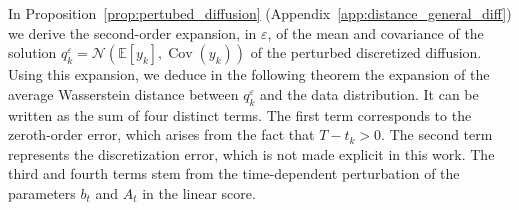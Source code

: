\documentclass[11pt]{article}
\newcommand{\EE}{\mathbb{E}}
\newcommand{\cov}{\operatorname{Cov}}
\begin{document}
In Proposition~\ref{prop:pertubed_diffusion} (Appendix~\ref{app:distance_general_diff}) we derive the second-order expansion, in $\varepsilon$, of the mean and covariance of the solution $q^\varepsilon_k = \mathcal{N}(\EE[y_{k}], \cov(y_k))$ of the perturbed discretized diffusion.
Using this expansion, we deduce in the following theorem the expansion of the average Wasserstein distance between $q_k^\varepsilon$ and the data distribution. It can be written as the sum of four distinct terms. The first term corresponds to the zeroth-order error, which arises from the fact that $T-t_k >0$. The second term represents the discretization error, which is not made explicit in this work. The third and fourth terms stem from the time-dependent perturbation of the parameters \(b_t\) and \(A_t\) in the linear score. 
\end{document}
